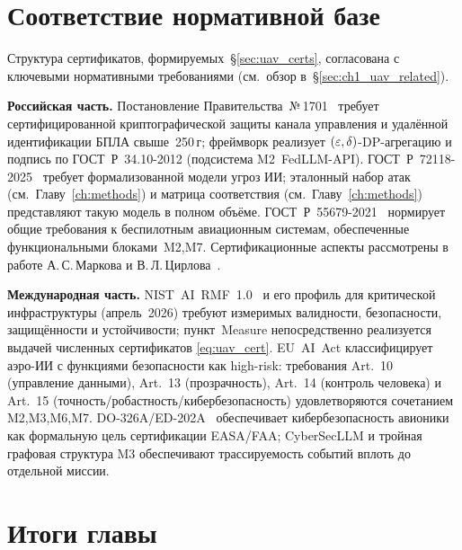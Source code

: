 \section{Соответствие нормативной базе}
\label{sec:uav_regulation}

Структура сертификатов, формируемых~\S\ref{sec:uav_certs}, согласована
с ключевыми нормативными требованиями (см.\ обзор
в~\S\ref{sec:ch1_uav_related}).

\noindent\textbf{Российская часть.}
Постановление Правительства~№\,1701~\cite{decree_1701} требует
сертифицированной криптографической защиты канала управления и
удалённой идентификации БПЛА свыше~250\,г; фреймворк реализует
$(\varepsilon,\delta)$-DP-агрегацию и подпись по \mbox{ГОСТ~Р~34.10-2012}
(подсистема \textsf{M2~FedLLM-API}).
\mbox{ГОСТ~Р~72118-2025}~\cite{GOST_R_72118_2025} требует
формализованной модели угроз ИИ; эталонный набор атак
(см.\ Главу~\ref{ch:methods}) и матрица соответствия
(см.\ Главу~\ref{ch:methods}) представляют такую модель в полном объёме.
\mbox{ГОСТ~Р~55679-2021}~\cite{GOST_R_55679_2021} нормирует общие
требования к беспилотным авиационным системам, обеспеченные
функциональными блоками~\textsf{M2,M7}. Сертификационные аспекты
рассмотрены в работе А.\,С.\,Маркова и В.\,Л.\,Цирлова~\cite{Markov2023certify}.

\noindent\textbf{Международная часть.}
\mbox{NIST~AI~RMF~1.0}~\cite{nist_rmf_2023} и его профиль для
критической инфраструктуры (апрель~2026) требуют измеримых валидности,
безопасности, защищённости и устойчивости; пункт~\textsf{Measure}
непосредственно реализуется выдачей численных сертификатов
\eqref{eq:uav_cert}. \mbox{EU~AI~Act} классифицирует аэро-ИИ с
функциями безопасности как high-risk: требования Art.~10 (управление
данными), Art.~13 (прозрачность), Art.~14 (контроль человека) и
Art.~15 (точность/робастность/кибербезопасность) удовлетворяются
сочетанием \textsf{M2,M3,M6,M7}. \mbox{DO-326A/ED-202A}~\cite{do_326a_2024}
обеспечивает кибербезопасность авионики как формальную цель
сертификации EASA/FAA; \textsf{CyberSecLLM} и тройная графовая структура
\textsf{M3} обеспечивают трассируемость событий вплоть до отдельной
миссии.


\section{Итоги главы}
\label{sec:uav_summary}

